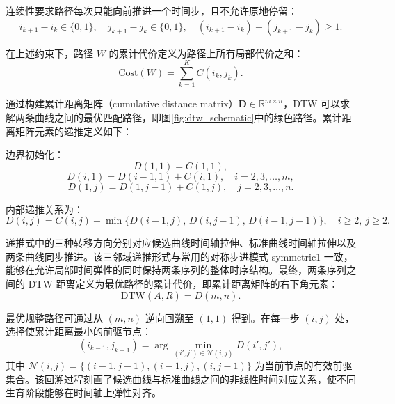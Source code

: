 连续性要求路径每次只能向前推进一个时间步，且不允许原地停留：
\begin{equation}
    i_{k+1}-i_k\in\{0,1\},\quad j_{k+1}-j_k\in\{0,1\},\quad (i_{k+1}-i_k)+(j_{k+1}-j_k)\ge 1.
    \label{eq:dtw_continuity}
\end{equation}

在上述约束下，路径 \(W\) 的累计代价定义为路径上所有局部代价之和：
\begin{equation}
    \mathrm{Cost}(W)=\sum_{k=1}^{K}C(i_k,j_k).
    \label{eq:dtw_path_cost}
\end{equation}

通过构建累计距离矩阵（cumulative distance matrix）\(\mathbf{D}\in\mathbb{R}^{m\times n}\)，DTW 可以求解两条曲线之间的最优匹配路径，即图\ref{fig:dtw_schematic}中的绿色路径。累计距离矩阵元素的递推定义如下：

边界初始化：
\begin{equation}
    D(1,1)=C(1,1),
    \label{eq:dtw_init}
\end{equation}
\begin{equation}
    D(i,1)=D(i-1,1)+C(i,1),\quad i=2,3,\ldots,m,
    \label{eq:dtw_init_i}
\end{equation}
\begin{equation}
    D(1,j)=D(1,j-1)+C(1,j),\quad j=2,3,\ldots,n.
    \label{eq:dtw_init_j}
\end{equation}

内部递推关系为：
\begin{equation}
    D(i,j)=C(i,j)+\min\bigl\{D(i-1,j),\,D(i,j-1),\,D(i-1,j-1)\bigr\},\quad i\ge 2,\ j\ge 2.
    \label{eq:dtw_recurrence}
\end{equation}

递推式中的三种转移方向分别对应候选曲线时间轴拉伸、标准曲线时间轴拉伸以及两条曲线同步推进。该三邻域递推形式与常用的对称步进模式 symmetric1 一致，能够在允许局部时间弹性的同时保持两条序列的整体时序结构\cite{Sakoe1978,Petitjean2012}。最终，两条序列之间的 DTW 距离定义为最优路径的累计代价，即累计距离矩阵的右下角元素：
\begin{equation}
    \mathrm{DTW}(A,R)=D(m,n).
    \label{eq:dtw_distance}
\end{equation}

最优规整路径可通过从 \((m,n)\) 逆向回溯至 \((1,1)\) 得到。在每一步 \((i,j)\) 处，选择使累计距离最小的前驱节点：
\begin{equation}
    (i_{k-1},j_{k-1})=\arg\min_{(i',j')\in\mathcal{N}(i,j)}D(i',j'),
    \label{eq:dtw_backtrack}
\end{equation}
其中 \(\mathcal{N}(i,j)=\{(i-1,j-1),(i-1,j),(i,j-1)\}\) 为当前节点的有效前驱集合。该回溯过程刻画了候选曲线与标准曲线之间的非线性时间对应关系，使不同生育阶段能够在时间轴上弹性对齐。

